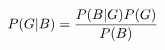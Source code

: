 \documentclass[preview]{standalone}
\begin{document}
\begin{align*}
\special{dvisvgm:raw <g id='unique000'>}P(G|B) = \dfrac{P(B|G)P(G)}{P(B)}\special{dvisvgm:raw </g>}
\end{align*}
\end{document}
